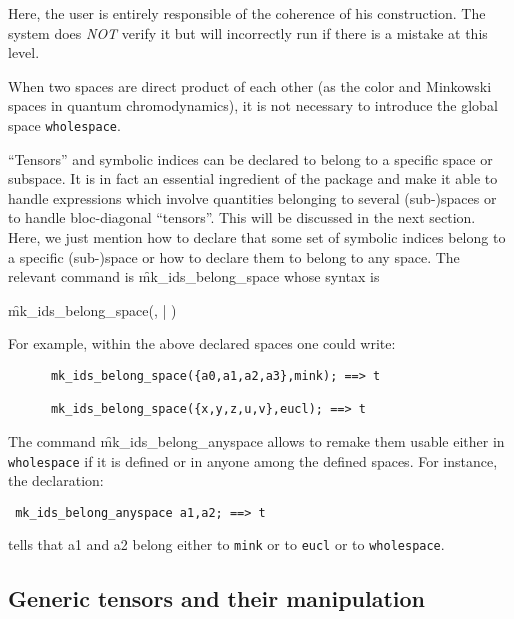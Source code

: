 Here, the user is entirely responsible of the coherence of his construction.
The system does \emph{NOT} verify it but will incorrectly run if there is a mistake
at this level.

When two spaces are direct product of each other (as the color and Minkowski
spaces in quantum chromodynamics), it is not necessary to introduce the
global space \texttt{wholespace}.

``Tensors'' and symbolic indices can be declared to belong to a specific space
or subspace. It is in fact an essential ingredient of the package and make it
able to handle expressions which involve quantities belonging to several
(sub-)spaces or to handle bloc-diagonal ``tensors''.
This will be discussed in the next section.
Here, we just mention how to declare that some set of symbolic indices belong
to a specific (sub-)space or how to declare them to belong
to any space.
The relevant command is \f{mk\_ids\_belong\_space}
whose syntax is
\begin{syntax}
    \f{mk\_ids\_belong\_space}(, | )
\end{syntax}
\pagebreak[1]
For example, within the above declared spaces one could write:
\begin{verbatim}
      mk_ids_belong_space({a0,a1,a2,a3},mink); ==> t

      mk_ids_belong_space({x,y,z,u,v},eucl); ==> t
\end{verbatim} 
The command 
\hypertarget{command:MK_IDS_BELONG_ANYSPACE}{\f{mk\_ids\_belong\_anyspace}}
allows to remake them usable  either in \texttt{wholespace}
if it is defined or in anyone among the defined spaces.
For instance, the declaration:
\begin{verbatim}
 mk_ids_belong_anyspace a1,a2; ==> t
\end{verbatim}
tells that a1 and a2 belong either to \texttt{mink} or to \texttt{eucl} or
to \texttt{wholespace}.

\subsection{Generic tensors and their manipulation}

